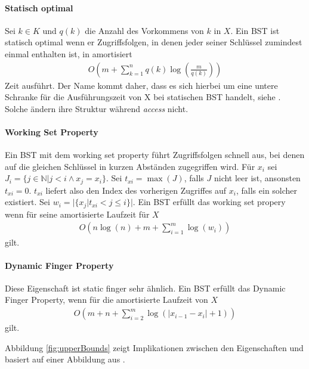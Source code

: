 \documentclass[a4paper,12pt]{article}
\begin{document}
\paragraph{Statisch optimal}
Sei $k \in K$ und $q(k)$ die Anzahl des Vorkommens von $k$ in  $X$. Ein BST ist statisch optimal wenn er Zugriffsfolgen, in denen jeder seiner Schlüssel zumindest einmal enthalten ist, in amortisiert 
\begin{align*}
O\left(m +\sum_{k = 1}^{n}q(k)\log \left( \frac{m}{q(k)} \right)\right) 
\end{align*}
Zeit ausführt. Der Name kommt daher, dass es sich hierbei um eine untere Schranke für die Ausführungszeit von X bei statischen BST handelt, siehe \cite{staticOptimal}. Solche ändern ihre Struktur während \textit{access} nicht.

\paragraph{Working Set Property}
Ein BST mit dem working set property führt Zugriffsfolgen schnell aus, bei denen auf die gleichen Schlüssel in kurzen Abständen zugegriffen wird.
Für $x_i$ sei $J_i = \{j \in \mathbb{N} \vert j < i \land x_j = x_i \}$.
Sei $t_{xi} = \max \left(J\right)$, falls $J$ nicht leer ist, ansonsten $t_{xi} = 0$. $t_{xi}$ liefert also den Index des vorherigen Zugriffes auf $x_i$, falls ein solcher existiert. Sei ${w_i = \vert\{x_j \vert t_{xi} < j \leq i   \} \vert }$.
Ein BST erfüllt das working set propery wenn für seine amortisierte Laufzeit für $X$
\begin{align*}
O\left(n \log\left( n\right) + m +\sum_{i = 1}^{m} \log \left(w_i\right) \right)
\end{align*} 
gilt. 


\paragraph{Dynamic Finger Property}
Diese Eigenschaft ist static finger sehr ähnlich.
Ein BST erfüllt das Dynamic Finger Property, wenn für die amortisierte Laufzeit von $X$
\begin{align*}
O\left( m + n + \sum_{i = 2}^{m} \log \left(\vert x_{i-1} - x_i  \vert	+ 1	\right)\right)
\end{align*} 
gilt. 

\noindent Abbildung \ref{fig:upperBounds} zeigt Implikationen zwischen den Eigenschaften und basiert auf einer Abbildung aus \cite{upperBounds}.
\end{document}
